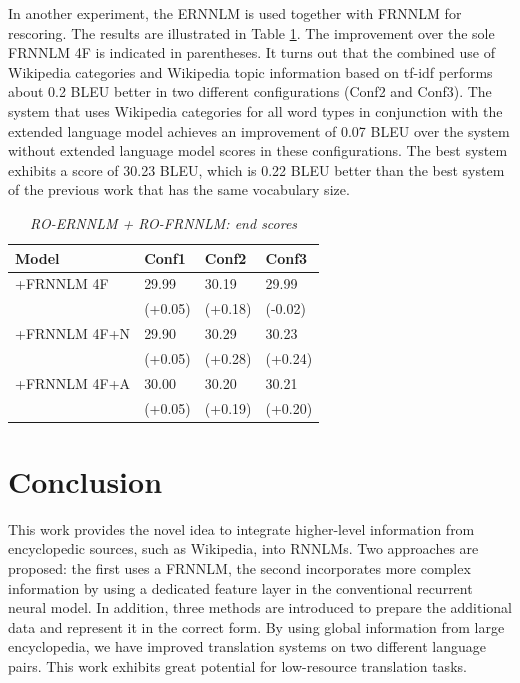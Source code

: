 \documentclass[a4paper]{article}
\begin{document}
In another experiment, the ERNNLM is used together with FRNNLM for rescoring. The results are illustrated in Table \ref{tb:ro-extended}. The improvement over the sole FRNNLM 4F is indicated in parentheses. It turns out that the combined use of Wikipedia categories and Wikipedia topic information based on tf-idf performs about 0.2 BLEU better in two different configurations (Conf2 and Conf3). The system that uses Wikipedia categories for all word types in conjunction with the extended language model achieves an improvement of 0.07 BLEU over the system without extended language model scores in these configurations.
The best system exhibits a score of 30.23 BLEU, which is 0.22 BLEU better than the best system of the previous work \cite{niehuesusing} that has the same vocabulary size.

\begin{table}
\caption{\it RO-ERNNLM + RO-FRNNLM: end scores}
\vspace{2mm}
\centering
  \begin{tabular}{llll}
  	\hline
  	Model        & Conf1   & Conf2   & Conf3   \\ \hline\hline
  	+FRNNLM 4F   & 29.99   & 30.19   & 29.99   \\
  	             & (+0.05) & (+0.18) & (-0.02) \\
  	+FRNNLM 4F+N & 29.90   & 30.29   & 30.23   \\
  	             & (+0.05) & (+0.28) & (+0.24) \\
  	+FRNNLM 4F+A & 30.00   & 30.20   & 30.21   \\
  	             & (+0.05) & (+0.19) & (+0.20)
  \end{tabular}
  \label{tb:ro-extended}
\end{table}


\section{Conclusion}
This work provides the novel idea to integrate higher-level information from encyclopedic sources, such as Wikipedia, into RNNLMs. Two approaches are proposed: the first uses a FRNNLM, the second incorporates more complex information by using a dedicated feature layer in the conventional recurrent neural model. In addition, three methods are introduced to prepare the additional data and represent it in the correct form.
By using global information from large encyclopedia, we have improved translation systems on two different language pairs.  
This work exhibits great potential for low-resource translation tasks. 
\end{document}
